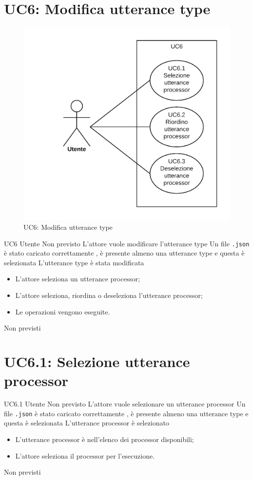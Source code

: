 \documentclass[../AnalisideiRequisiti.tex]{subfiles}
\begin{document}
	\section{UC6: Modifica utterance type}
	\begin{figure}[H]
		\centering
		\includegraphics[width=\textwidth]{../img/UC6.png}
		\caption{UC6: Modifica utterance type}
	\end{figure}
	\UserCase
	{UC6}
	{Utente}
	{Non previsto}
	{L'attore vuole modificare l'utterance type}
	{Un file \verb|.json| è stato caricato correttamente , è presente almeno una utterance type e questa è selezionata }
	{L'utterance type è stata modificata}
	{
		\begin{itemize}
			\item{} L'attore seleziona un utterance processor;
			\item{} L'attore seleziona, riordina o deseleziona l'utterance processor;
			\item{} Le operazioni vengono eseguite.
		\end{itemize}
	}
	{Non previsti}
	
	\section{UC6.1: Selezione utterance processor}
	\UserCase
	{UC6.1}
	{Utente}
	{Non previsto}
	{L'attore vuole selezionare un utterance processor}
	{Un file \verb|.json| è stato caricato correttamente , è presente almeno una utterance type e questa è selezionata }
	{L'utterance processor è selezionato}
	{
		\begin{itemize}
			\item{} L'utterance processor è nell'elenco dei processor disponibili;
			\item{} L'attore seleziona il processor per l'esecuzione.
		\end{itemize}
	}
	{Non previsti}
	
\end{document}
